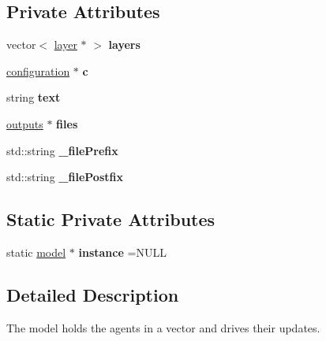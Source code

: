 \subsection*{Private Attributes}
\begin{DoxyCompactItemize}
\item 
\mbox{\label{classmodel_ac3dcc51c9ff2eecdd10793629206b65d}} 
vector$<$ \mbox{\hyperlink{classlayer}{layer}} $\ast$ $>$ {\bfseries layers}
\item 
\mbox{\label{classmodel_a742b5b77848d0dbdc032e1a51274ba08}} 
\mbox{\hyperlink{classconfiguration}{configuration}} $\ast$ {\bfseries c}
\item 
\mbox{\label{classmodel_a3791961971c5e979086eadc7127e7c78}} 
string {\bfseries text}
\item 
\mbox{\label{classmodel_a8eae0977871b806881319ff8091f5389}} 
\mbox{\hyperlink{classoutputs}{outputs}} $\ast$ {\bfseries files}
\item 
\mbox{\label{classmodel_a361a901c3aa70774e254457065ebeb0e}} 
std\+::string {\bfseries \+\_\+file\+Prefix}
\item 
\mbox{\label{classmodel_ae5e7e93a6aeb1584eda754f91b1cdd4e}} 
std\+::string {\bfseries \+\_\+file\+Postfix}
\end{DoxyCompactItemize}
\subsection*{Static Private Attributes}
\begin{DoxyCompactItemize}
\item 
\mbox{\label{classmodel_a486d4ee9311769407729f640fe3f42b4}} 
static \mbox{\hyperlink{classmodel}{model}} $\ast$ {\bfseries instance} =N\+U\+LL
\end{DoxyCompactItemize}


\subsection{Detailed Description}
The model holds the agents in a vector and drives their updates. 

